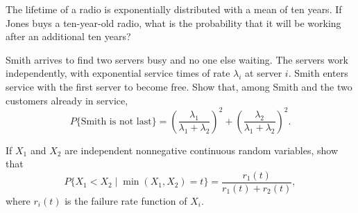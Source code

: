 \begin{exercise}
\label{ex:counting-processes-5}
The lifetime of a radio is exponentially distributed with a mean of ten years. If Jones buys a ten-year-old radio, what is the probability that it will be working after an additional ten years?
\end{exercise}


\begin{exercise}
\label{ex:counting-processes-6}
Smith arrives to find two servers busy and no one else waiting. The servers work independently, with exponential service times of rate $\lambda_i$ at server $i$. Smith enters service with the first server to become free. Show that, among Smith and the two customers already in service,
\[
P\{\text{Smith is not last}\}
=
\left(\frac{\lambda_1}{\lambda_1+\lambda_2}\right)^2
+
\left(\frac{\lambda_2}{\lambda_1+\lambda_2}\right)^2.
\]
\end{exercise}


\begin{exercise}
\label{ex:counting-processes-7}
If $X_1$ and $X_2$ are independent nonnegative continuous random variables, show that
\[
P\{X_1<X_2\mid \min(X_1,X_2)=t\}
=
\frac{r_1(t)}{r_1(t)+r_2(t)},
\]
where $r_i(t)$ is the failure rate function of $X_i$.
\end{exercise}

